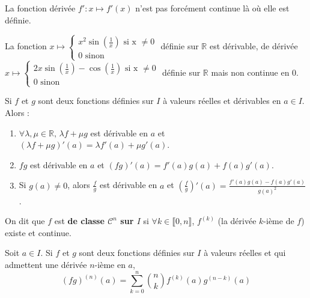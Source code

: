 
  \begin{remark}
    La fonction dérivée $f' : x \mapsto f'(x)$ n'est pas forcément continue là où elle est définie.
  \end{remark}

  \begin{example}
    La fonction $x \mapsto \begin{cases}
      x^2 \sin \left(\frac{1}{x}\right) \text{ si x } \neq 0 \\
      0 \text{ sinon}
    \end{cases}$ définie sur $\mathbb{R}$ est dérivable, de dérivée $x \mapsto \begin{cases}
    2x \sin \left(\frac{1}{x}\right) - \cos \left(\frac{1}{x}\right) \text{ si x } \neq 0 \\
    0 \text{ sinon}
    \end{cases}$ définie sur $\mathbb{R}$ mais non continue en $0$.
  \end{example}

  \begin{proposition}
    Si $f$ et $g$ sont deux fonctions définies sur $I$ à valeurs réelles et dérivables en $a \in I$. Alors :
    \begin{enumerate}[label=(\roman*)]
      \item $\forall \lambda, \mu \in \mathbb{R}, \, \lambda f + \mu g$ est dérivable en $a$ et $(\lambda f + \mu g)'(a) = \lambda f'(a) + \mu g'(a)$.
      \item $fg$ est dérivable en $a$ et $(fg)'(a) = f'(a) g(a) + f(a) g'(a)$.
      \item Si $g(a) \neq 0$, alors $\frac{f}{g}$ est dérivable en $a$ et $\left(\frac{f}{g}\right)'(a) = \frac{f'(a) g(a) - f(a) g'(a)}{g(a)^2}$.
     \end{enumerate}
  \end{proposition}

  \begin{definition}
    On dit que $f$ est \textbf{de classe $\mathcal{C}^n$ sur $I$} si $\forall k \in \llbracket 0, n \rrbracket$, $f^{(k)}$ (la dérivée $k$-ième de $f$) existe et continue.
  \end{definition}

  \begin{proposition}
    Soit $a \in I$. Si $f$ et $g$ sont deux fonctions définies sur $I$ à valeurs réelles et qui admettent une dérivée $n$-ième en $a$,
    \[ (fg)^{(n)}(a) = \sum_{k=0}^n \binom{n}{k} f^{(k)}(a) g^{(n-k)}(a) \]
  \end{proposition}

